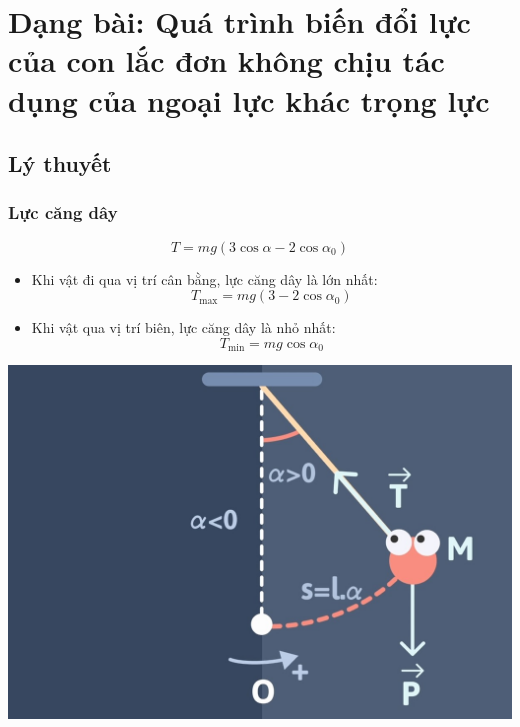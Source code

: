 
\chapter[Dạng bài: Quá trình biến đổi lực\\ của con lắc đơn không chịu tác dụng\\ của ngoại lực khác trọng lực]{Dạng bài: Quá trình biến đổi lực của con lắc đơn không chịu tác dụng của ngoại lực khác trọng lực}
\section{Lý thuyết}
\subsection{Lực căng dây}
\begin{equation*}
	T = mg (3\cos \alpha - 2 \cos \alpha_0)
\end{equation*}
\begin{itemize}
	\item Khi vật đi qua vị trí cân bằng, lực căng dây là lớn nhất:
	\begin{equation*}
		T_{\text{max}} =mg (3 -2 \cos \alpha_0)
	\end{equation*}
	\item Khi vật qua vị trí biên, lực căng dây là nhỏ nhất:
	\begin{equation*}
		T_{\text{min}} =mg \cos \alpha_0
	\end{equation*}
\end{itemize}
\begin{center}
	\includegraphics[scale=0.3]{../figs/VN12-PH-04-A-003-2-V2-1.jpg}
\end{center}

